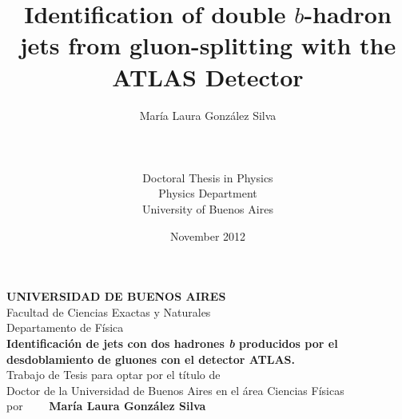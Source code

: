 \documentclass[11pt,a4paper,12pt]{report}
\title{Identification of double $b$-hadron jets from gluon-splitting with the ATLAS Detector}
\author{Mar\'ia Laura Gonz\'alez Silva \\ \\ \\ \\Doctoral Thesis in Physics\\Physics Department\\University of Buenos Aires}
\date{November 2012}
\begin{document}
\maketitle


\newpage

\thispagestyle{empty}
\begin{figure}[h]
  \begin{center}
  \end{center}
\end{figure}

\begin{center}
  {\bfseries UNIVERSIDAD DE BUENOS AIRES}\\
  \vspace{0.5cm}
  Facultad de Ciencias Exactas y Naturales\\
  \vspace{0.5cm}
  Departamento de F\'isica\\
  \vspace{1.5cm}
         {\large {\bfseries Identificaci\'on de jets con dos hadrones \emph{b} producidos por el desdoblamiento de gluones con el detector ATLAS.}}\\ %
         \vspace{1.5cm}
         Trabajo de Tesis para optar por el t\'itulo de \\
         Doctor de la Universidad de Buenos Aires en el \'area Ciencias F\'isicas\\
         \vspace{1.5cm}
         por $\qquad ${\bfseries Mar\'ia Laura Gonz\'alez Silva}\\
         \vspace{1.5cm}
\end{center}
\end{document}

